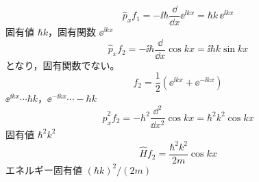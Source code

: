 \[ \hat{p}_{x}f_{1}=-\ii\hbar\frac{\dd}{\dd x}\ee^{\ii kx}=\hbar k\,\ee^{\ii kx} \]
固有値 $\hbar k$，固有関数 $\ee^{\ii kx}$
\[ \hat{p}_{x}f_{2}=-\ii\hbar\frac{\dd}{\dd x}\cos kx=\ii\hbar k\sin kx \]
となり，固有関数でない。
\[ f_{2}=\frac{1}{2}(\ee^{\ii kx}+\ee^{-\ii kx}) \]
$\ee^{\ii kx}\cdots\hbar k$，\quad $\ee^{-\ii kx}\cdots-\hbar k$
\[ \hat{p}_{x}^{2}f_{2}=-\hbar^{2}\frac{\dd^{2}}{\dd x^{2}}\cos kx=\hbar^{2}k^{2}\cos kx \]
固有値 $\hbar^{2}k^{2}$
\[ \hat{H}f_{2}=\frac{\hbar^{2}k^{2}}{2m}\cos kx \]
エネルギー固有値 $(\hbar k)^{2}/(2m)$
